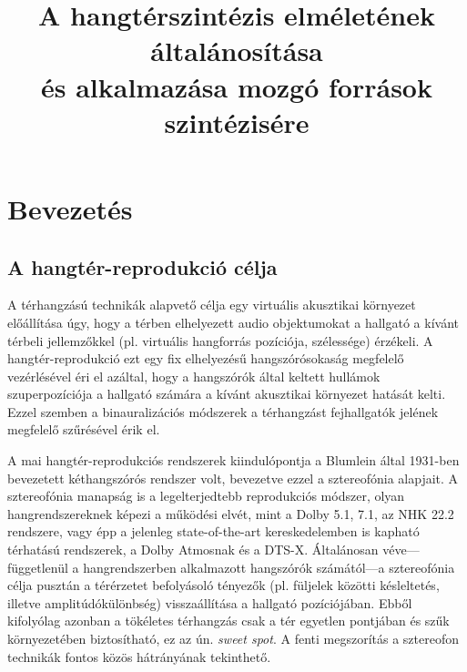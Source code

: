 \documentclass[10pt,twoside]{article}
\author{\theauthor}
\title{A hangtérszintézis elméletének általánosítása\\[.5ex]és alkalmazása mozgó források szintézisére}
\theoremstyle{thesisgroupstyle}
\theoremstyle{indented}
\begin{document}
\sloppy
\newcommand{\schoolname}{Budapesti Műszaki és Gazdaságtudományi Egyetem}
\newcommand{\facultyname}{Villamosmérnöki és Informatikai Kar}
\newcommand{\doctoralname}{Villamosmérnöki Tudományok Doktori Iskola}
\newcommand{\bookname}{PhD tézisfüzet}
\newcommand{\authorname}{Author}
\newcommand{\supervisorname}{Konzulens:}
\newcommand{\supervisor}{Dr. Fiala Péter}
\newcommand{\creationdate}{Budapest, 2019.}
\def \deptlogo {logos/hit_logo_en.png}
\def \lablogo {logos/last_logo_eng.png}

\nonfrenchspacing


\thispagestyle{empty}
\cleardoublepage
\setcounter{page}{1}

\section{Bevezetés}

\subsection{A hangtér-reprodukció célja}
%
A térhangzású technikák alapvető célja egy virtuális akusztikai környezet előállítása úgy, hogy a térben elhelyezett audio objektumokat a hallgató a kívánt térbeli jellemzőkkel (pl. virtuális hangforrás pozíciója, szélessége) érzékeli.
A hangtér-reprodukció ezt egy fix elhelyezésű hangszórósokaság megfelelő vezérlésével éri el azáltal, hogy a hangszórók által keltett hullámok szuperpozíciója a hallgató számára a kívánt akusztikai környezet hatását kelti.
Ezzel szemben a binauralizációs módszerek a térhangzást fejhallgatók jelének megfelelő szűrésével érik el.

A mai hangtér-reprodukciós rendszerek kiindulópontja a Blumlein által 1931-ben bevezetett kéthangszórós rendszer volt, bevezetve ezzel a sztereofónia alapjait.
A sztereofónia manapság is a legelterjedtebb reprodukciós módszer, olyan hangrendszereknek képezi a működési elvét, mint a Dolby 5.1, 7.1, az NHK 22.2 rendszere, vagy épp a jelenleg state-of-the-art kereskedelemben is kapható térhatású rendszerek, a Dolby Atmosnak és a DTS-X.
Általánosan véve---függetlenül a hangrendszerben alkalmazott hangszórók számától---a sztereofónia célja pusztán a térérzetet befolyásoló tényezők (pl. füljelek közötti késleltetés, illetve amplitúdókülönbség) visszaállítása a hallgató pozíciójában.
Ebből kifolyólag azonban a tökéletes térhangzás csak a tér egyetlen pontjában és szűk környezetében biztosítható, ez az ún. \emph{sweet spot}.
A fenti megszorítás a sztereofon technikák fontos közös hátrányának tekinthető.
\end{document}
